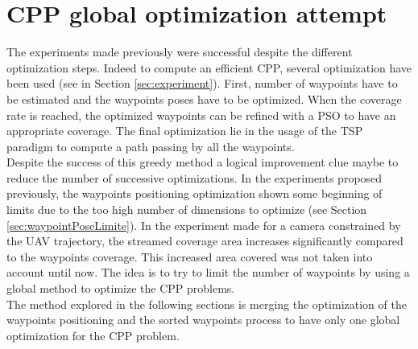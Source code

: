 \section{CPP global optimization attempt}

The experiments made previously were successful despite the different optimization steps. Indeed to compute an efficient CPP, several optimization have been used (see in Section \ref{sec:experiment}). %
First, number of waypoints have to be estimated and the waypoints poses have to be optimized. When the coverage rate is reached, the optimized waypoints can be refined with a PSO to have an appropriate coverage. The final optimization lie in the usage of the TSP paradigm to compute a path passing by all the waypoints.%
\\Despite the success of this greedy method a logical improvement clue maybe to reduce the number of successive optimizations. In the experiments proposed previously, the waypoints positioning optimization shown some beginning of limits due to the too high number of dimensions to optimize (see Section \ref{sec:waypointPoseLimite}). 
In the experiment made for a camera constrained by the UAV trajectory, the streamed coverage area increases significantly compared to the waypoints coverage. This increased area covered was not taken into account until now. The idea is to try to limit the number of waypoints by using a global method to optimize the CPP problems.\\
The method explored in the following sections is  merging the optimization of the waypoints positioning and the sorted waypoints process to have only one global optimization for the CPP problem. 
 
